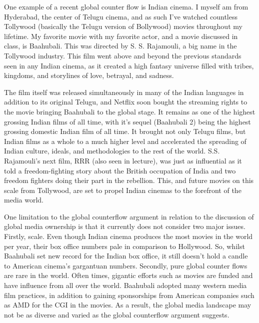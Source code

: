 \documentclass[a4paper]{article}
\begin{document}
        One example of a recent global counter flow is Indian cinema. I myself am from Hyderabad, the center of Telugu cinema, and as such I’ve watched countless 
        Tollywood (basically the Telugu version of Bollywood) movies throughout my lifetime. My favorite movie with my favorite actor, and a movie discussed in class, 
        is Baahubali. This was directed by S. S. Rajamouli, a big name in the Tollywood industry. This film went above and beyond the previous standards seen in any 
        Indian cinema, as it created a high fantasy universe filled with tribes, kingdoms, and storylines of love, betrayal, and sadness. 
        
        The film itself was released simultaneously in many of the Indian languages in addition to its original Telugu, and Netflix soon bought the streaming rights 
        to the movie bringing Baahubali to the global stage. It remains as one of the highest grossing Indian films of all time, with it’s sequel (Baahubali 2) being 
        the highest grossing domestic Indian film of all time. It brought not only Telugu films, but Indian films as a whole to a much higher level and accelerated the 
        spreading of Indian culture, ideals, and methodologies to the rest of the world. S.S. Rajamouli’s next film, RRR (also seen in lecture), was just as influential 
        as it told a freedom-fighting story about the British occupation of India and two freedom fighters doing their part in the rebellion. This, and future movies on 
        this scale from Tollywood, are set to propel Indian cinemas to the forefront of the media world. \citep{lesson10}
        
        One limitation to the global counterflow argument in relation to the discussion of global media ownership is that it currently does not consider two major issues. 
        Firstly, scale. Even though Indian cinema produces the most movies in the world per year, their box office numbers pale in comparison to Hollywood. So, whilst 
        Baahubali set new record for the Indian box office, it still doesn’t hold a candle to American cinema’s gargantuan numbers. Secondly, pure global counter flows 
        are rare in the world. Often times, gigantic efforts such as movies are funded and have influence from all over the world. Baahubali adopted many western media film 
        practices, in addition to gaining sponsorships from American companies such as AMD for the CGI in the movies. As a result, the global media landscape may not be as 
        diverse and varied as the global counterflow argument suggests.
\end{document}
